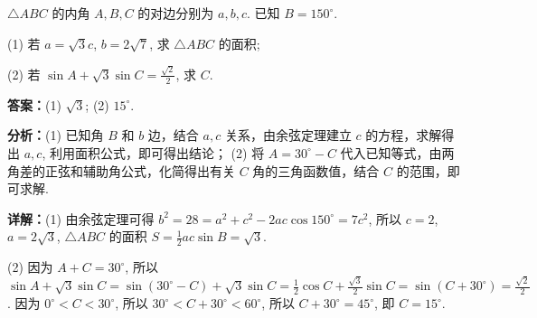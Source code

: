 \begin{question}[points=12]
$\triangle ABC$ 的内角 $A, B, C$ 的对边分别为 $a, b, c$. 已知 $B=150^\circ$.



(1) 若 $a=\sqrt{3}c$, $b=2\sqrt{7}$, 求 $\triangle ABC$ 的面积;



(2) 若 $\sin A + \sqrt{3}\sin C = \frac{\sqrt{2}}{2}$, 求 $C$.
\begin{solution}
\textbf{答案：}(1) $\sqrt{3}$; (2) $15^\circ$.

\textbf{分析：}(1) 已知角 $B$ 和 $b$ 边，结合 $a,c$ 关系，由余弦定理建立 $c$ 的方程，求解得出 $a,c$, 利用面积公式，即可得出结论； (2) 将 $A=30^\circ - C$ 代入已知等式，由两角差的正弦和辅助角公式，化简得出有关 $C$ 角的三角函数值，结合 $C$ 的范围，即可求解.

\textbf{详解：}(1) 由余弦定理可得 $b^2 = 28 = a^2 + c^2 - 2ac\cos150^\circ = 7c^2$, 所以 $c=2$, $a=2\sqrt{3}$, $\triangle ABC$ 的面积 $S = \frac{1}{2}ac\sin B = \sqrt{3}$.

(2) 因为 $A+C=30^\circ$, 所以 $\sin A + \sqrt{3}\sin C = \sin(30^\circ - C) + \sqrt{3}\sin C = \frac{1}{2}\cos C + \frac{\sqrt{3}}{2}\sin C = \sin(C+30^\circ) = \frac{\sqrt{2}}{2}$. 因为 $0^\circ < C < 30^\circ$, 所以 $30^\circ < C+30^\circ < 60^\circ$, 所以 $C+30^\circ = 45^\circ$, 即 $C=15^\circ$.
\end{solution}
\end{question}

